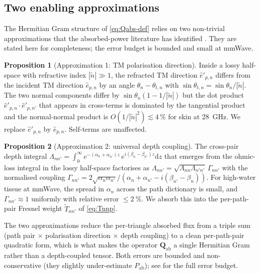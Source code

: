 \documentclass[11pt,a4paper]{article}
\theoremstyle{definition}
\newtheorem{proposition}[proposition]{Proposition}
\newcommand{\diff}{\mathrm{d}}
\newcommand{\Qabs}{\mathbf{Q}_{\mathrm{ab}}}
\newcommand{\Pabs}{P_{\mathrm{ab}}}
\begin{document}
\subsection{Two enabling approximations}\label{sec:approxs}

The Hermitian Gram structure of \cref{eq:Qabs-def} relies on two
non-trivial approximations that the absorbed-power literature has
identified
\cite{Wydaeghe2025monograph}.  They are stated here for
completeness; the error budget is bounded and small at mmWave.

\begin{proposition}[Approximation 1: TM polarisation direction]
\label{prop:approx1}
Inside a lossy half-space with refractive index $|\tilde n|\gg 1$,
the refracted TM direction $\hat e'_{p,n}$ differs from the
incident TM direction $\hat e_{p,n}$ by an angle
$\theta_n-\theta_{t,n}$ with $\sin\theta_{t,n}=
\sin\theta_n/|\tilde n|$.  The two normal components differ by
$\sin\theta_n(1-1/|\tilde n|)$ but the dot product
$\hat e'_{p,n}\cdot\hat e'_{p,n'}$ that appears in cross-terms is
dominated by the tangential product and the normal-normal product
is $O(1/|\tilde n|^2)\lesssim 4\,\%$ for skin at \SI{28}{\GHz}.  We
replace $\hat e'_{p,n}$ by $\hat e_{p,n}$.  Self-terms are
unaffected.
\end{proposition}

\begin{proposition}[Approximation 2: universal depth coupling]
\label{prop:approx2}
The cross-pair depth integral
\(
  \Lambda_{nn'}=\int_0^\infty e^{-(\alpha_n+\alpha_{n'})z}\,
  e^{i(\beta_n-\beta_{n'})z}\diff z
\)
that emerges from the ohmic-loss integral in the lossy half-space
factorises as $\Lambda_{nn'}=\sqrt{\Lambda_{nn}\Lambda_{n'n'}}\,
\Gamma_{nn'}$ with the normalised coupling
$\Gamma_{nn'}=2\sqrt{\alpha_n\alpha_{n'}}/(\alpha_n+\alpha_{n'}-
i(\beta_{n'}-\beta_n))$.  For high-water tissue at mmWave, the
spread in $\alpha_n$ across the path dictionary is small, and
$\Gamma_{nn'}\approx 1$ uniformly with relative error
$\le\SI{2}{\percent}$.  We absorb this into the per-path-pair
Fresnel weight $\tilde T_{nn'}$ of \cref{eq:Tnnp}.
\end{proposition}

The two approximations reduce the per-triangle absorbed flux from
a triple sum (path pair $\times$ polarisation direction $\times$
depth coupling) to a clean per-path-pair quadratic form, which is
what makes the operator $\Qabs$ a single Hermitian Gram rather
than a depth-coupled tensor.  Both errors are bounded and
non-conservative (they slightly under-estimate $\Pabs$); see
\cite{Wydaeghe2025monograph} for the full error budget.
\end{document}
